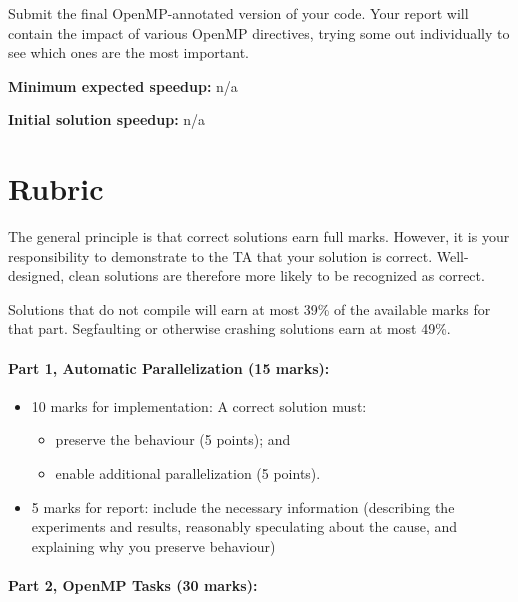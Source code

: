 \documentclass[letterpaper,10pt]{article}
\begin{document}
Submit the final OpenMP-annotated version of your code. Your report will contain the impact of various OpenMP directives, trying some out individually to see which ones are the most important.

\squishlist
  \item {\bf Minimum expected speedup:} n/a
  \item {\bf Initial solution speedup:} n/a
\squishend


\section*{Rubric}

The general principle is that correct solutions earn full marks.
However, it is your responsibility to demonstrate to the TA
that your solution is correct. Well-designed, clean solutions 
are therefore more likely to be recognized as correct. 

Solutions that do not compile will earn at most 39\% of the available
marks for that part. Segfaulting or otherwise crashing solutions earn
at most 49\%.

\paragraph{Part 1, Automatic Parallelization (15 marks):}  
\begin{itemize}
\item 10 marks for implementation: A correct solution must:
\begin{itemize}
	\item preserve the behaviour (5 points); and
	\item enable additional parallelization (5 points).
\end{itemize}
 
\item 5 marks for report: include the necessary information
(describing the experiments and results, reasonably speculating about
the cause, and explaining why you preserve behaviour)
\end{itemize}

\paragraph{Part 2, OpenMP Tasks (30 marks):} 
\end{document}
